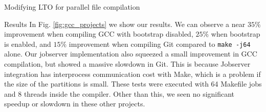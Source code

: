 \begin{section}{Modifying LTO for parallel file compilation}
\begin{subsection}{Results}
In Fig. \ref{fig:gcc_projects} we show our results. We can observe a near
$35\%$ improvement when compiling GCC with bootstrap disabled, $25\%$ when
bootstrap is enabled, and $15\%$ improvement when compiling Git compared to
\texttt{make -j64} alone. Our jobserver implementation also squeezed a small
improvement in GCC compilation, but showed a massive slowdown in Git. This is
because Jobserver integration has interprocess communication cost
with Make, which is a problem if the size of the partitions is small.  These
tests were executed with 64 Makefile jobs and 8 threads inside the compiler.
Other than this, we seen no significant speedup or slowdown in these other
projects.

\begin{table}[]
\caption{Speedup of highlighted files}
\label{table:files}
\end{table}


\end{subsection}
\end{section}
